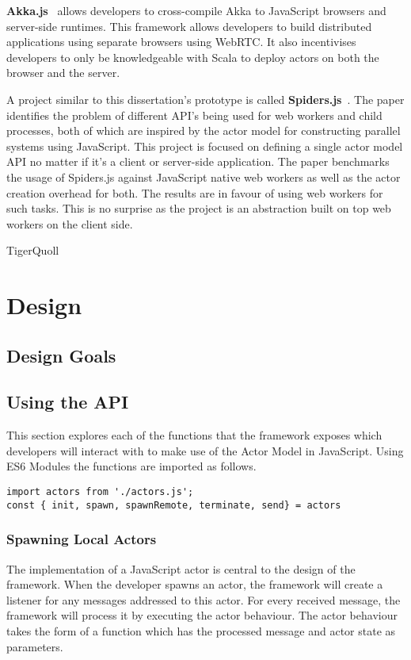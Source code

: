 \documentclass[12pt, a4paper]{report}
\theoremstyle{definition}
\theoremstyle{definition}%
\theoremstyle{definition}%
\theoremstyle{definition}%
\theoremstyle{definition}%
\theoremstyle{definition}%
\begin{document}
\textbf{Akka.js}~\cite{stivan2015akka} allows developers to cross-compile Akka to JavaScript browsers and server-side runtimes. This framework allows developers to build distributed applications using separate browsers using WebRTC. It also incentivises developers to only be knowledgeable with Scala to deploy actors on both the browser and the server.

A project similar to this dissertation's prototype is called \textbf{Spiders.js}~\cite{spidersjs}. The paper identifies the problem of different API's being used for web workers and child processes, both of which are inspired by the actor model for constructing parallel systems using JavaScript. This project is focused on defining a single actor model API no matter if it's a client or server-side application. The paper benchmarks the usage of Spiders.js against JavaScript native web workers as well as the actor creation overhead for both. The results are in favour of using web workers for such tasks. This is no surprise as the project is an abstraction built on top web workers on the client side.

TigerQuoll~\cite{tigerquoll}
\chapter{Design}
\section{Design Goals}
\section{Using the API}
This section explores each of the functions that the framework exposes which developers will interact with to make use of the Actor Model in JavaScript. Using ES6 Modules the functions are imported as follows.
\begin{lstlisting}
import actors from './actors.js';
const { init, spawn, spawnRemote, terminate, send} = actors
\end{lstlisting}
\subsection{Spawning Local Actors}
The implementation of a JavaScript actor is central to the design of the framework. When the developer spawns an actor, the framework will create a listener for any messages addressed to this actor. For every received message, the framework will process it by executing the actor behaviour. The actor behaviour takes the form of a function which has the processed message and actor state as parameters.
\end{document}
